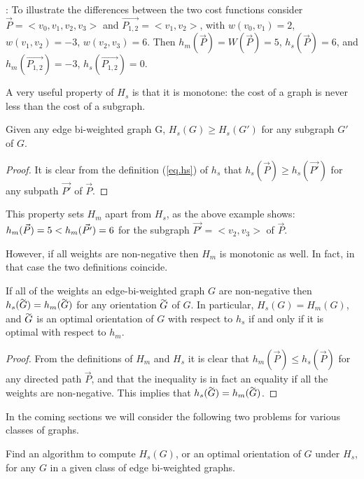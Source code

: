 : To illustrate the differences between the two cost functions consider
 $\vec{P}=<v_0,v_1,v_2,v_3>$ and $\vec{P_{1,2}}=<v_1,v_2>$, with $w(v_0,v_1)=2$, $w(v_1,v_2)=-3$, $w(v_2,v_3)=6$.
 Then $h_m(\vec{P})=W(\vec{P})=5$, $h_s(\vec{P})=6$, and 
 $h_m(\vec{P_{1,2}})=-3$, $h_s(\vec{P_{1,2}})=0$.

A very useful property of $H_s$ is that it is monotone: the cost of a graph is never less than the cost of a subgraph.
\begin{lemma}\label{lem:sprop}
	Given any edge bi-weighted graph G,
	$H_{s}(G)\geq  H_{s}(G')$ for any subgraph $G'$ of $G$. 
\end{lemma}

\begin{proof}
It is clear from the definition (\ref{eq.hs}) of $h_s$ that $h_s(\vec{P})\geq h_s(\vec{P '})$ for any subpath 
$\vec{P '}$ of $\vec{P}$.  
\end{proof}

This property sets $H_m$ apart from $H_s$,  as the above example shows:
$h_{m}(\vec{P})=5 <  h_{m}(\vec{P'})=6$ for the subgraph $\vec{P '}=<v_2,v_3>$ of $\vec{P}$.

However, if all weights are non-negative then $H_m$ is monotonic as well. In fact, in that case the two definitions coincide.

\begin{lemma}
	If all of the weights an edge-bi-weighted graph $G$ are non-negative 
	then $h_{s}( \tildeb{G} )= h_{m}(\tildeb{G})$ for any orientation $\tildeb{G}$ of $G$.
	In particular,  $H_{s}(G)= H_{m}(G)$,  and 
	$\tildeb{G}$ is an optimal orientation of $G$ with respect to $h_{s}$
	if and only if it is optimal with respect to $ h_{m} $.
\end{lemma}
\begin{proof}
From the definitions of $H_m$ and $H_s$ it is clear that  $h_{m}(\vec{P})\leq  h_{s}(\vec{P})$
for any directed path $\vec{P}$, and that the inequality is in fact an equality if all the weights 
are non-negative. This implies that $h_{s}(\tildeb{G})= h_{m}(\tildeb{G})$.
\end{proof}
%

\medskip
In the coming sections we will consider the following two problems
for various classes of graphs.

\begin{problem}
	Find an algorithm to compute
	$H_s(G) $, or an optimal orientation of $G$ under $H_s$,
	for any $G$ in a given class of edge bi-weighted graphs.
\end{problem}


